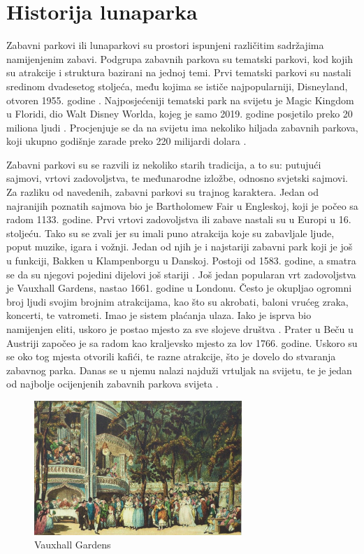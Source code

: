 \chapter{Historija lunaparka}

Zabavni parkovi ili lunaparkovi su prostori ispunjeni različitim sadržajima namijenjenim zabavi. Podgrupa zabavnih parkova su tematski parkovi, kod kojih su atrakcije i struktura bazirani na jednoj temi. Prvi tematski parkovi su nastali sredinom dvadesetog stoljeća, među kojima se ističe najpopularniji, Disneyland, otvoren 1955. godine \cite{Global}. Najposjećeniji tematski park na svijetu je Magic Kingdom u Floridi, dio Walt Disney Worlda, kojeg je samo 2019. godine posjetilo preko 20 miliona ljudi \cite{tematski}. Procjenjuje se da na svijetu ima nekoliko hiljada zabavnih parkova, koji ukupno godišnje zarade preko 220 milijardi dolara \cite{900years}. 

Zabavni parkovi su se razvili iz nekoliko starih tradicija, a to su: putujući sajmovi, vrtovi zadovoljstva, te međunarodne izložbe, odnosno svjetski sajmovi. Za razliku od navedenih, zabavni parkovi su trajnog karaktera. Jedan od najranijih poznatih sajmova bio je Bartholomew Fair u Engleskoj, koji je počeo sa radom 1133. godine. Prvi vrtovi zadovoljstva ili zabave nastali su u Europi u 16. stoljeću. Tako su se zvali jer su imali puno atrakcija koje su zabavljale ljude, poput muzike, igara i vožnji. Jedan od njih je i najstariji zabavni park koji je još u funkciji, Bakken u Klampenborgu u Danskoj. Postoji od 1583. godine, a smatra se da su njegovi pojedini dijelovi još stariji \cite{900years}. Još jedan popularan vrt zadovoljstva je Vauxhall Gardens, nastao 1661. godine u Londonu. Često je okupljao ogromni broj ljudi svojim brojnim atrakcijama, kao što su akrobati, baloni vrućeg zraka, koncerti, te vatrometi. Imao je sistem plaćanja ulaza. Iako je isprva bio namijenjen eliti, uskoro je postao mjesto za sve slojeve društva \cite{UKHistorija}. Prater u Beču u Austriji započeo je sa radom kao kraljevsko mjesto za lov 1766. godine. Uskoro su se oko tog mjesta otvorili kafići, te razne atrakcije, što je dovelo do stvaranja zabavnog parka. Danas se u njemu nalazi najduži vrtuljak na svijetu, te je jedan od najbolje ocijenjenih zabavnih parkova svijeta \cite{900years}. 

\begin{figure}[h!]
  \centering
  \includegraphics[width=0.7\textwidth]{vauxhall}
  \caption{Vauxhall Gardens \cite{900years}}
  \label{fig:Slika_Vauxhall}
\end{figure}

